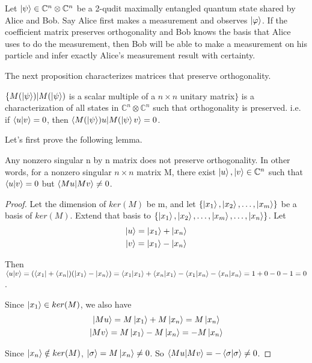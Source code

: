 \begin{prop}
Let $\ket{\psi} \in \mathbb{C}^n \otimes \mathbb{C}^{n}$ be a 2-qudit maximally entangled quantum state shared by Alice and Bob. Say Alice first makes a measurement and observes $\ket{\varphi}$. If the coefficient matrix preserves orthogonality and Bob knows the basis that Alice uses to do the measurement, then Bob will be able to make a measurement on his particle and infer exactly Alice's measurement result with certainty. 
\end{prop}

The next proposition characterizes matrices that preserve orthogonality.
\begin{prop} \label{orthogonality preserving character}
$\{M(\ket{\psi})|M(\ket{\psi})$ is a scalar multiple of a $n \times n$ unitary matrix$\}$ is a characterization of all states in $\mathbb{C}^n \otimes \mathbb{C}^n$ such that orthogonality is preserved. i.e. if $\braket{u|v}=0$, then $\braket{M(\ket{\psi})u|M(\ket{\psi}v}=0$.
\end{prop}

Let's first prove the following lemma.

\begin{lemma}
Any nonzero singular n by n matrix does not preserve orthogonality. In other words, for a nonzero singular $n \times n$ matrix M, there exist $\ket{u}, \ket{v} \in \mathbb{C}^n$ such that $\braket{u|v}=0$ but $\braket{Mu|Mv} \ne 0$.
\end{lemma}

\begin{proof}

Let the dimension of $ker(M)$ be m, and let $\{\ket{x_1}, \ket{x_2},\hdots, \ket{x_m}\}$ be a basis of $ker(M)$. Extend that basis to $\{\ket{x_1}, \ket{x_2},\hdots, \ket{x_m}, \hdots, \ket{x_n}\}$. Let
\begin{gather*}
    \ket{u}=\ket{x_1}+\ket{x_n}\\
    \ket{v}=\ket{x_1}-\ket{x_n}
\end{gather*}

Then $\braket{u|v}=(\bra{x_1}+\bra{x_n})(\ket{x_1}-\ket{x_n})=\braket{x_1|x_1}+\braket{x_n|x_1}-\braket{x_1|x_n}-\braket{x_n|x_n}=1+0-0-1=0$.

Since $\ket{x_1} \in ker(M)$, we also have
\begin{gather*}
    \ket{Mu}=M\ket{x_1}+M\ket{x_n}=M\ket{x_n}\\
    \ket{Mv}=M\ket{x_1}-M\ket{x_n}=-M\ket{x_n}    
\end{gather*}

Since $\ket{x_n} \notin ker(M)$, $\ket{\sigma}=M\ket{x_n} \ne 0$. So $\braket{Mu|Mv}=-\braket{\sigma|\sigma} \ne 0$.
\end{proof}

